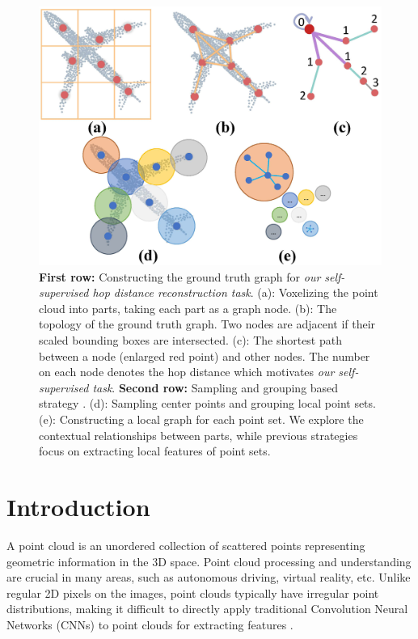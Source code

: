 \documentclass[letterpaper]{article}
\begin{document}
\begin{figure}[!h]
\centering
\begin{minipage}[b]{0.9\linewidth}
\begin{center}
\includegraphics[width=0.85\linewidth]{images/intro_pic.jpg}
\end{center}
\end{minipage}
\caption{
\textbf{First row:} Constructing the ground truth graph for \textit{our self-supervised hop distance reconstruction task}. (a): Voxelizing the point cloud into parts, taking each part as a graph node. (b): The topology of the ground truth graph. Two nodes are adjacent if their scaled bounding boxes are intersected. (c): The shortest path between a node (enlarged red point) and other nodes.
The number on each node denotes the hop distance which motivates \textit{our self-supervised task}.
\textbf{Second row:} Sampling and grouping based strategy \cite{dgcnn, wang2019graphattenconv}. (d): Sampling center points and grouping local point sets. (e): Constructing a local graph for each point set.
We explore the contextual relationships between parts, while previous strategies focus on extracting local features of point sets.
}
\label{fig:intro_pic}
\end{figure}


\section{Introduction}
\label{sec:intro}
A point cloud is an unordered collection of scattered points representing geometric information in the 3D space.
Point cloud processing and understanding are crucial in many areas, such as autonomous driving, virtual reality, etc.
Unlike regular 2D pixels on the images, point clouds typically have irregular point distributions, making it difficult to directly apply traditional Convolution Neural Networks (CNNs) to point clouds for extracting features \cite{shi2020pointgnn,de2023iterativepfn,zhang2020pointfilter}.
\end{document}

